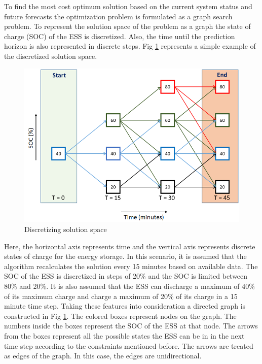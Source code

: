 To find the most cost optimum solution based on the current system status and future forecasts the optimization problem is formulated as a graph search problem. To represent the solution space of the problem as a graph the state of charge (SOC) of the ESS is discretized. Also, the time until the prediction horizon is also represented in discrete steps. Fig \ref{fig:F1_Dis} represents a simple example of the discretized solution space.

\begin{figure}[!ht]
    \centering
    \includegraphics[width = \linewidth]{figs/F1_1_Dis.png}
    \caption{Discretizing solution space}
    \label{fig:F1_Dis}
\end{figure}
Here, the horizontal axis represents time and the vertical axis represents discrete states of charge for the energy storage. In this scenario, it is assumed that the algorithm recalculates the solution every 15 minutes based on available data. The SOC of the ESS is discretized in steps of 20\% and the SOC is limited between 80\% and 20\%. It is also assumed that the ESS can discharge a maximum of 40\% of its maximum charge and charge a maximum of 20\% of its charge in a 15 minute time step. Taking these features into consideration a directed graph is constructed in Fig \ref{fig:F1_Dis}. The colored boxes represent nodes on the graph. The numbers inside the boxes represent the SOC of the ESS at that node. The arrows from the boxes represent all the possible states the ESS can be in in the next time step according to the constraints mentioned before. The arrows are treated as edges of the graph. In this case, the edges are unidirectional.

